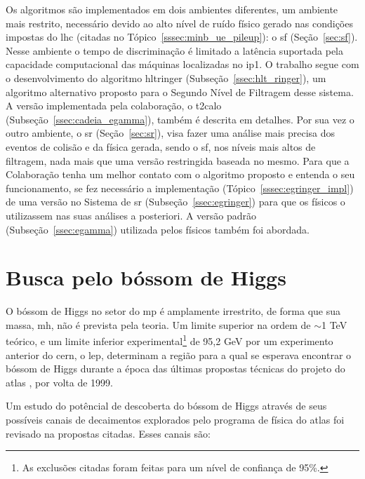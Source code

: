 Os algoritmos são implementados em dois ambientes diferentes, um ambiente mais
restrito, necessário devido ao alto nível de ruído físico gerado nas condições 
impostas do \gls{lhc} (citadas no Tópico~\ref{sssec:minb_ue_pileup}): o
\glsdesc{sf} (Seção~\ref{sec:sf}). Nesse ambiente o tempo de discriminação 
é limitado a latência suportada pela capacidade computacional das máquinas localizadas 
no \gls{ip}1. O trabalho segue com o desenvolvimento do algoritmo
\acrlong{hltringer} (Subseção~\ref{ssec:hlt_ringer}), um algoritmo alternativo proposto para o
Segundo Nível de Filtragem desse sistema. A versão implementada pela
colaboração, o \gls{t2calo} (Subseção~\ref{ssec:cadeia_egamma}), 
também é descrita em detalhes. Por sua vez o outro ambiente, o \glsdesc{sr}
(Seção~\ref{sec:sr}), visa fazer uma análise mais precisa dos eventos de colisão e da 
física gerada, sendo o \glsdesc{sf}, nos níveis mais altos de filtragem, 
nada mais que uma versão restringida baseada no mesmo. Para que a Colaboração tenha 
um melhor contato com o algoritmo proposto e entenda o seu funcionamento, se fez
necessário a implementação (Tópico~\ref{sssec:egringer_impl}) de uma versão no Sistema 
de \glsdesc{sr} (Subseção~\ref{ssec:egringer}) para que os físicos o utilizassem nas suas 
análises a posteriori. A versão padrão (Subseção~\ref{ssec:egamma}) utilizada
pelos físicos também foi abordada.


\section{Busca pelo bóssom de Higgs}
\label{sec:busca_higgs}


O bóssom de Higgs no setor do \gls{mp} é amplamente irrestrito, de forma que sua
massa, \acrshort{mh}, não é prevista pela teoria. Um limite superior na ordem de
$\sim$1 TeV teórico, e um limite inferior experimental\footnote{As exclusões
citadas foram feitas para um nível de confiança de 95\%.\label{fn:95cl}} de 95,2
GeV \cite{lep_higgs_1999} por um experimento anterior do \gls{cern}, o \gls{lep}, determinam a região para a qual
se esperava encontrar o bóssom de Higgs durante a época das últimas propostas técnicas
do projeto do \gls{atlas} \cite{ATLAS_TDR,ATLAS_TDR2}, por volta de 1999. 

Um estudo do potêncial de descoberta do bóssom de Higgs através de seus
possíveis canais de decaimentos explorados pelo programa de física do
\gls{atlas} foi revisado na propostas citadas. Esses canais são:

